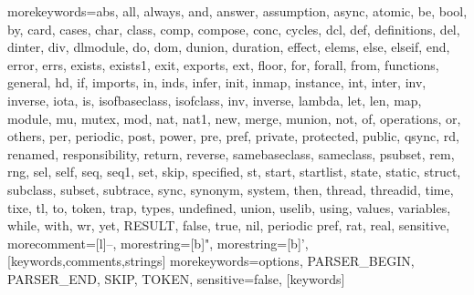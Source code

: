   {morekeywords={abs, all,
     always, and, answer, assumption, async, atomic, be, bool, by, card, cases,
     char, class, comp, compose, conc, cycles, dcl, def, definitions,
     del, dinter, div, dlmodule, do,
     dom, dunion, duration, effect, elems, else, elseif, end, error, errs, exists,
     exists1, exit, exports, ext, floor, for, forall, from, functions,
     general, hd, if, imports, in,
     inds, infer, init, inmap, instance, int, inter, inv, inverse, iota, is,
     isofbaseclass, isofclass, inv, inverse, lambda, let, len, map,
     module, mu, mutex, mod,
     nat, nat1, new, merge, munion, not, of, operations, or, others, per, periodic,
     post, power, pre, pref, private, protected, public, qsync, rd,
     renamed, responsibility,
     return, reverse, samebaseclass, sameclass, psubset, rem, rng, sel, self, seq,
     seq1, set, skip, specified, st, start, startlist, state, static, struct,
     subclass, subset,
     subtrace, sync, synonym, system, then, thread, threadid, time, tixe, tl, to,
     token, trap, types, undefined, union, uselib, using, values, variables, while,
     with, wr, yet, RESULT, false, true, nil, periodic pref, rat, real},
   sensitive,
   morecomment=[l]--,
   morestring=[b]",
   morestring=[b]',
  }[keywords,comments,strings]
  {morekeywords={options, PARSER\_BEGIN, PARSER\_END, SKIP, TOKEN},
   sensitive=false,
  }[keywords]
